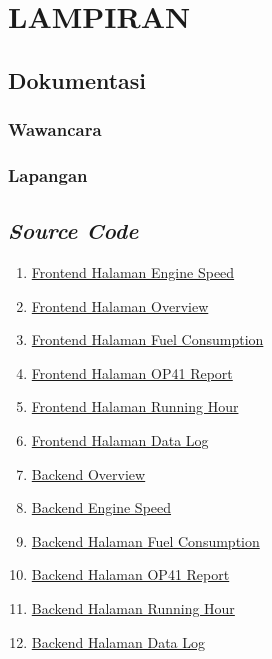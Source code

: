 \chapter*{LAMPIRAN}

\section{Dokumentasi}

\subsection{Wawancara}
\subsection{Lapangan}


\section{\textit{Source Code}}

\begin{enumerate}
    \item \href{https://github.com}{Frontend Halaman Engine Speed}
    \item \href{https://github.com}{Frontend Halaman Overview}
    \item \href{https://github.com}{Frontend Halaman Fuel Consumption}
    \item \href{https://github.com}{Frontend Halaman OP41 Report}
    \item \href{https://github.com}{Frontend Halaman Running Hour}
    \item \href{https://github.com}{Frontend Halaman Data Log}
    \item \href{https://github.com}{Backend Overview}
    \item \href{https://github.com}{Backend Engine Speed}
    \item \href{https://github.com}{Backend Halaman Fuel Consumption}
    \item \href{https://github.com}{Backend Halaman OP41 Report}
    \item \href{https://github.com}{Backend Halaman Running Hour}
    \item \href{https://github.com}{Backend Halaman Data Log}
\end{enumerate}